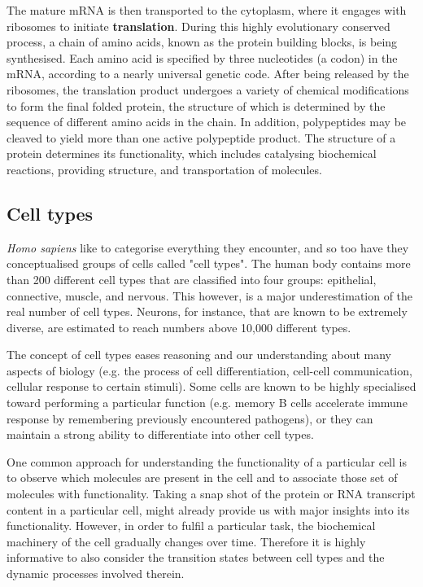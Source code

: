 The mature mRNA is then transported to the cytoplasm, where it engages with ribosomes to initiate \textbf{translation}. During this highly evolutionary conserved process, a chain of amino acids, known as the protein building blocks, is being synthesised. Each amino acid is specified by three nucleotides (a codon) in the mRNA, according to a nearly universal genetic code. After being released by the ribosomes, the translation product undergoes a variety of chemical modifications to form the final folded protein, the structure of which is determined by the sequence of different amino acids in the chain. In addition, polypeptides may be cleaved to yield more than one active polypeptide product. The structure of a protein determines its functionality, which includes catalysing biochemical reactions, providing structure, and transportation of molecules.


\subsection{Cell types}
\textit{Homo sapiens} like to categorise everything they encounter, and so too have they conceptualised groups of cells called "cell types". The human body contains more than 200 different cell types that are classified into four groups: epithelial, connective, muscle, and nervous. This however, is a major underestimation of the real number of cell types. Neurons, for instance, that are known to be extremely diverse, are estimated to reach numbers above 10,000 different types\cite{strachan_humanmoleculargenetics_2011}.

The concept of cell types eases reasoning and our understanding about many aspects of biology (e.g. the process of cell differentiation, cell-cell communication, cellular response to certain stimuli). Some cells are known to be highly specialised toward performing a particular function (e.g. memory B cells accelerate immune response by remembering previously encountered pathogens), or they can maintain a strong ability to differentiate into other cell types.

One common approach for understanding the functionality of a particular cell is to observe which molecules are present in the cell and to associate those set of molecules with functionality. Taking a snap shot of the protein or RNA transcript content in a particular cell, might already provide us with major insights into its functionality. However, in order to fulfil a particular task, the biochemical machinery of the cell gradually changes over time. Therefore it is highly informative to also consider the transition states between cell types and the dynamic processes involved therein.

